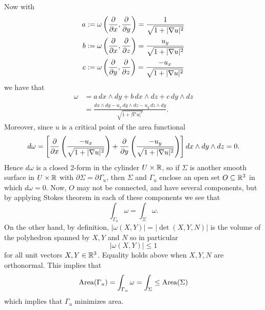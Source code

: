 Now with
\begin{align*}
    a &:= \omega\left(\frac{\partial}{\partial x}, \frac{\partial}{\partial y}\right) = \frac{1}{\sqrt{1+|\nabla u|^2}} \\
    b &:= \omega\left(\frac{\partial}{\partial x}, \frac{\partial}{\partial z}\right) = \frac{u_y}{\sqrt{1+|\nabla u|^2}} \\
    c &:= \omega\left(\frac{\partial}{\partial y}, \frac{\partial}{\partial z}\right) = \frac{-u_x}{\sqrt{1+|\nabla u|^2}} \\
\end{align*}
we have that
\begin{align*}
    \omega &=a\, dx\wedge dy + b\, dx\wedge dz + c\, dy\wedge dz \\
    &= \frac{dx\wedge dy - u_x\, dy\wedge dz - u_y\, dz\wedge dy}{\sqrt{1+|\nabla u|^2}}.
\end{align*}
Moreover, since $u$ is a critical point of the area functional
\[
    d\omega = \left[ \frac{\partial}{\partial x} \left(\frac{-u_x}{\sqrt{1+|\nabla u|^2}}\right) + \frac{\partial}{\partial y}\left(\frac{-u_y}{\sqrt{1+|\nabla u|^2}}\right) \right] dx \wedge dy \wedge dz = 0.
\]
Hence $d\omega$ is a closed 2-form in the cylinder $U \times \mathbb{R}$, so if $\Sigma$ is another smooth surface in $U \times \mathbb{R}$ with $\partial \Sigma = \partial \Gamma_u$, then $\Sigma$ and $\Gamma_u$ enclose an open set $O \subseteq \mathbb{R}^3$ in which $d\omega=0$. Now, $O$ may not be connected, and have several components, but by applying Stokes theorem in each of these components we see that
\[
    \int_{\Gamma_u}\omega = \int_{\Sigma}\omega.
\]
On the other hand, by definition, $|\omega(X,Y)| = |\det(X,Y,N)|$ is the volume of the polyhedron spanned by $X,Y$ and $N$ so in particular
\[
    |\omega(X,Y)| \le 1
\]
for all unit vectors $X,Y\in \mathbb{R}^3$. Equality holds above when $X,Y,N$ are orthonormal. This implies that
\[
    \operatorname{Area}(\Gamma_u) = \int_{\Gamma_u}\omega = \int_{\Sigma} \le \operatorname{Area}(\Sigma)
\]
which implies that $\Gamma_u$ minimizes area.
